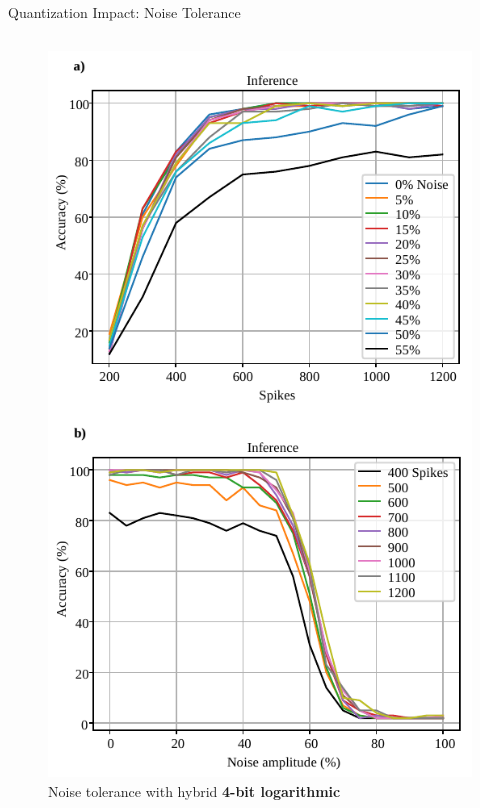 \begin{frame}{Quantization Impact: Noise Tolerance}
\begin{columns}
		\begin{column}{0.33\textwidth}
			\centering
			\begin{figure}
				\includegraphics[width=0.75\linewidth]{../chapters/sbs_accelerator/figures/accuracy_vs_noise_pu_log.pdf} %
				\caption{ Noise tolerance with hybrid \textbf{4-bit logarithmic}}
			\end{figure}
		\end{column}
	\end{columns}
\end{frame}


